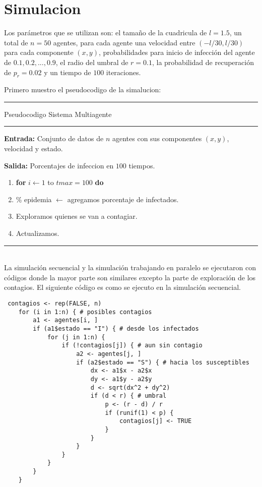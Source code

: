 \documentclass[10pt,a4paper]{article}
\begin{document}
\section{Simulacion}

Los parámetros que se utilizan son: el tamaño de la cuadricula de $\mathit{l} = 1.5$, un total de $n = 50$ agentes, para cada agente una velocidad entre $(- \mathit{l}/30, \mathit{l}/30)$ para cada componente $(x, y)$, probabilidades para inicio de infección del agente de $0.1, 0.2,..., 0.9$, el radio del umbral de $r = 0.1$, la probabilidad de recuperación de $p_{r} = 0.02$ y un tiempo de $100$ iteraciones.\\

\newpage

Primero muestro el pseudocodigo de la simalucion:

\rule{120mm}{0.1mm} 

Pseudocodigo  Sistema Multiagente

\rule{120mm}{0.1mm} 

\textbf{Entrada:} Conjunto de datos de $n$ agentes con sus componentes $(x, y)$, velocidad y estado.

\textbf{Salida:} Porcentajes de infeccion en $100$ tiempos.
\begin{enumerate}
	\item \textbf{for} $i \leftarrow 1$ to $tmax = 100$ \textbf{do}
	\item \hspace{5mm} \% epidemia $\leftarrow$ agregamos porcentaje de infectados.
	\item \hspace{5mm} Exploramos quienes se van a contagiar.
	\item \hspace{5mm} Actualizamos.
\end{enumerate}

\rule{120mm}{0.1mm} \\

La simulación secuencial y la simulación trabajando en paralelo se ejecutaron con códigos donde la mayor parte son similares excepto la parte de exploración de los contagios. El siguiente código es como se ejecuto en la simulación secuencial.

\begin{lstlisting}
 contagios <- rep(FALSE, n)
    for (i in 1:n) { # posibles contagios
        a1 <- agentes[i, ]
        if (a1$estado == "I") { # desde los infectados
            for (j in 1:n) {
                if (!contagios[j]) { # aun sin contagio
                    a2 <- agentes[j, ]
                    if (a2$estado == "S") { # hacia los susceptibles
                        dx <- a1$x - a2$x
                        dy <- a1$y - a2$y
                        d <- sqrt(dx^2 + dy^2)
                        if (d < r) { # umbral
                            p <- (r - d) / r
                            if (runif(1) < p) {
                                contagios[j] <- TRUE
                            }
                        }
                    }
                }
            }
        }
    }
\end{lstlisting}
\end{document}
